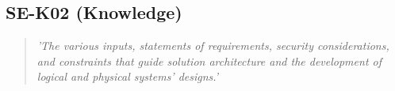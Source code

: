 \subsection{SE-K02 (Knowledge)}

  \begin{quote}
    \textit{'The various inputs, statements of requirements,
    security considerations, and constraints that guide solution
    architecture and the development of logical and physical
    systems’ designs.'}
  \end{quote}

\newpage